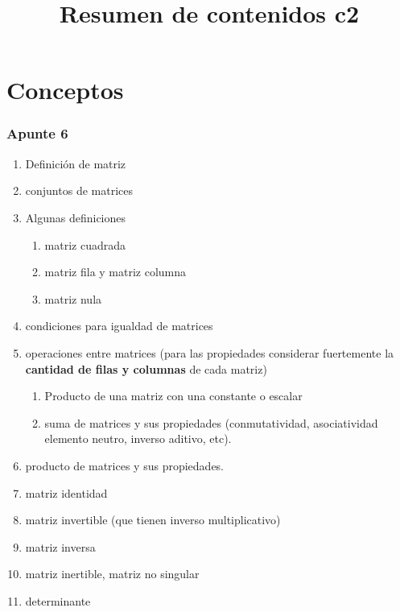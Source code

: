 \documentclass[]{article}
\title{Resumen de contenidos c2}
\author{}
\date{}
\begin{document}
\maketitle


\part{Conceptos}



\section{Apunte 6}

\begin{enumerate}
	\item Definición de matriz
	\item conjuntos de matrices
	\item Algunas definiciones
		\begin{enumerate}
			\item matriz cuadrada
			\item matriz fila y matriz columna
			\item matriz nula
		\end{enumerate}
	\item condiciones para igualdad de matrices
	\item operaciones entre matrices (para las propiedades considerar fuertemente la \textbf{cantidad de filas y columnas} de cada matriz)
		\begin{enumerate}
			\item Producto de una matriz con una constante o escalar
			\item suma de matrices y sus propiedades (conmutatividad, asociatividad elemento neutro, inverso aditivo, etc).
		\end{enumerate}
	\item producto de matrices y sus propiedades.
	\item matriz identidad
	\item matriz invertible (que tienen inverso multiplicativo)
	\item matriz inversa
	\item matriz inertible, matriz no singular
	\item determinante
	
\end{enumerate}



\clearpage
\end{document}
